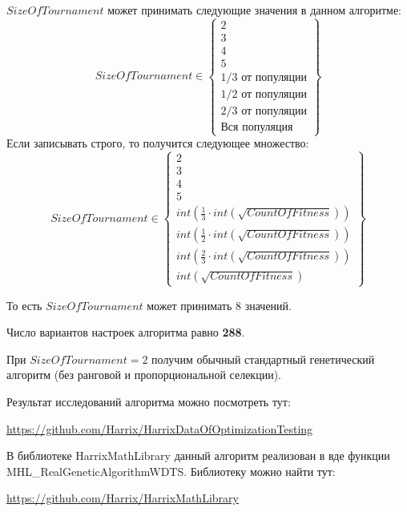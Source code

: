 $SizeOfTournament$ может принимать следующие значения в данном алгоритме:
\begin{equation}
SizeOfTournament \in \begin{Bmatrix}
2\\ 
3\\ 
4\\ 
5\\ 
1/3\text{ от популяции}\\ 
1/2\text{ от популяции}\\ 
2/3\text{ от популяции}\\ 
\text{Вся популяция} 
\end{Bmatrix}
\end{equation}
Если записывать строго, то получится следующее множество:
\begin{equation}
SizeOfTournament \in \begin{Bmatrix}
2\\ 
3\\ 
4\\ 
5\\ 
int\left( \frac{1}{3}\cdot int\left( \sqrt{CountOfFitness}\right)\right)  \\ 
int\left( \frac{1}{2}\cdot int\left( \sqrt{CountOfFitness}\right)\right)\\ 
int\left( \frac{2}{3}\cdot int\left( \sqrt{CountOfFitness}\right)\right)\\ 
int\left( \sqrt{CountOfFitness}\right)
\end{Bmatrix}
\end{equation}

То есть $SizeOfTournament$ может принимать $ 8 $ значений.

Число вариантов настроек алгоритма равно \textbf{288}.

При $ SizeOfTournament=2 $ получим обычный стандартный генетический алгоритм (без ранговой и пропорциональной селекции).

Результат исследований алгоритма можно посмотреть тут:

\href{https://github.com/Harrix/HarrixDataOfOptimizationTesting}{https://github.com/Harrix/HarrixDataOfOptimizationTesting}

В библиотеке HarrixMathLibrary данный алгоритм реализован в вде функции MHL\_RealGeneticAlgorithmWDTS. Библиотеку можно найти тут:

\href{https://github.com/Harrix/HarrixMathLibrary}{https://github.com/Harrix/HarrixMathLibrary}